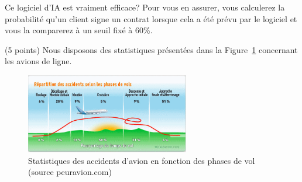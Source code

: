 \documentclass[a4paper]{article}
\newif\ifcorrection
\begin{document}
Ce logiciel d'IA est vraiment efficace? Pour vous en assurer, vous calculerez la probabilit\'e
qu'un client signe un contrat lorsque cela a \'et\'e pr\'evu par le logiciel et vous la comparerez \`a un seuil fix\'e \`a 60\%.

 \ifcorrection
 \textcolor{red}{
 On note $S = \{\text{Un client signe un contrat}\}$ et $T=\{\text{Prediction de signature par le logiciel d'IA}\}$\\
 On a alors $P(T|S) = 0,95$, $P(\bar{T}|\bar{S}) = 0,995$, $P(T|\bar{S}) = 1-P(\bar{T}|\bar{S}) = 5\times 10{-3}$ et $P(S) = 10^{-2}$.\\
 Le th\'eor\`eme des probabilit\'e totales permet de calculer:
 $P(T) = P(T|S)P(S) + P(T|\bar{S})P(\bar{S}) = 0,95 \times 10^{-2} + 5\times 10{-3} \times (1-10^{-2}) = 1,45 \times 10^{-2}$.\\
 Le th\'eor\`eme de Bayes nous permet d'\'ecrire: 
 $P(S|T) = \frac{P(T|S)P(S)}{P(T)} = \frac{0,95 \times 10^{-2}}{1,45 \times 10^{-2}} \approx 0,6552 > 0.6$\\
 On en d\'eduit que le syst\`eme de d\'etection est bien efficace!}
 \fi
 
 
\exost (5 points) Nous disposons des statistiques pr\'esent\'ees dans la Figure~\ref{fig:accidents} concernant les avions de ligne. %

\begin{figure}[!ht]
 \centering\includegraphics[width=270px]{./crash_avion.png}
 \caption{Statistiques des accidents d'avion en fonction des phases de vol (source peuravion.com)}\label{fig:accidents}
\end{figure}
\end{document}
